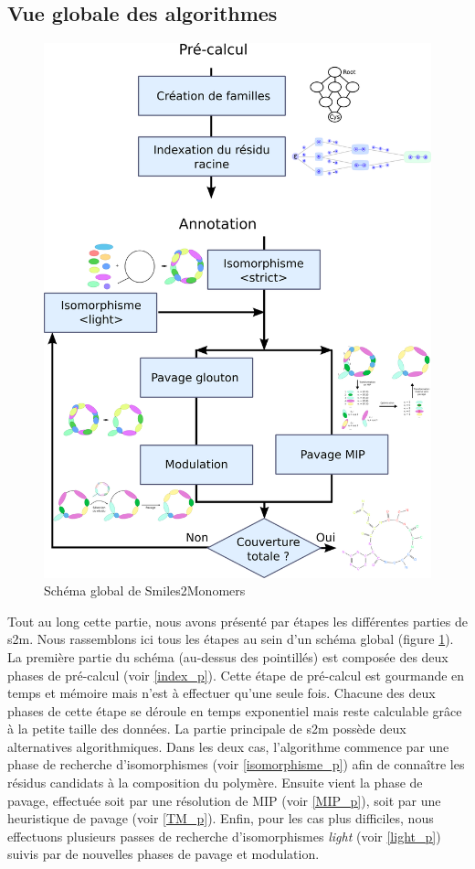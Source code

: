 \subsection{Vue globale des algorithmes}

\begin{figure}
  \begin{center}
    \includegraphics[width=450px]{Figures/s2m/algorithms.png}
    \caption{\label{global_s2m}Schéma global de Smiles2Monomers}
  \end{center}
\end{figure}

Tout au long cette partie, nous avons présenté par étapes les différentes parties de s2m.
Nous rassemblons ici tous les étapes au sein d'un schéma global (figure \ref{global_s2m}).
La première partie du schéma (au-dessus des pointillés) est composée des deux phases de pré-calcul (voir \ref{index_p}).
Cette étape de pré-calcul est gourmande en temps et mémoire mais n'est à effectuer qu'une seule fois.
Chacune des deux phases de cette étape se déroule en temps exponentiel mais reste calculable grâce à la petite taille des
données.
La partie principale de s2m possède deux alternatives algorithmiques.
Dans les deux cas, l'algorithme commence par une phase de recherche d'isomorphismes (voir \ref{isomorphisme_p}) afin de connaître les résidus candidats à la composition du polymère.
Ensuite vient la phase de pavage, effectuée soit par une résolution de MIP (voir \ref{MIP_p}), soit par une heuristique de pavage (voir \ref{TM_p}).
Enfin, pour les cas plus difficiles, nous effectuons plusieurs passes de recherche d'isomorphismes \textit{light} (voir \ref{light_p}) suivis par de nouvelles phases de pavage et modulation.

